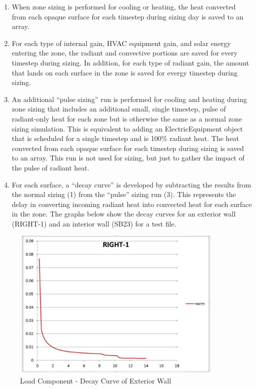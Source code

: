 \begin{enumerate}
\def\labelenumi{\arabic{enumi})}
\item
  When zone sizing is performed for cooling or heating, the heat convected from each opaque surface for each timestep during sizing day is saved to an array.
\item
  For each type of internal gain, HVAC equipment gain, and solar energy entering the zone, the radiant and convective portions are saved for every timestep during sizing. In addition, for each type of radiant gain, the amount that lands on each surface in the zone is saved for evergy timestep during sizing.
\item
  An additional ``pulse sizing'' run is performed for cooling and heating during zone sizing that includes an additional small, single timestep, pulse of radiant-only heat for each zone but is otherwise the same as a normal zone sizing simulation. This is equivalent to adding an ElectricEquipment object that is scheduled for a single timestep and is 100\% radiant heat. The heat convected from each opaque surface for each timestep during sizing is saved to an array. This run is not used for sizing, but just to gather the impact of the pulse of radiant heat.
\item
  For each surface, a ``decay curve'' is developed by subtracting the results from the normal sizing (1) from the ``pulse'' sizing run (3). This represents the delay in converting incoming radiant heat into convected heat for each surface in the zone. The graphs below show the decay curves for an exterior wall (RIGHT-1) and an interior wall (SB23) for a test file.
\end{enumerate}

\begin{figure}[hbtp] %
\centering
\includegraphics[width=0.9\textwidth, height=0.9\textheight, keepaspectratio=true]{media/image7912.png}
\caption{Load Component - Decay Curve of Exterior Wall \protect \label{fig:load-component-decay-curve-of-exterior-wall}}
\end{figure}

